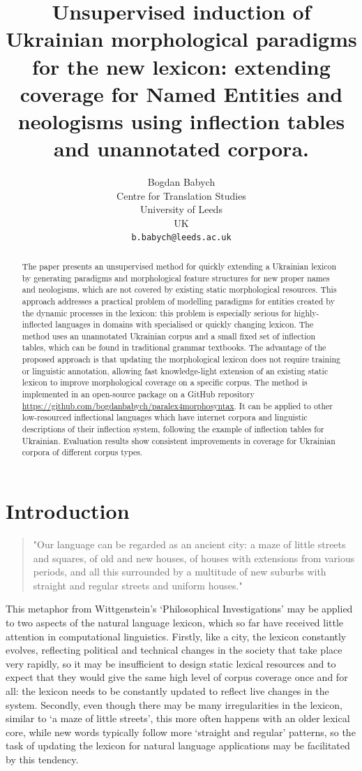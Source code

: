 \documentclass[11pt,a4paper]{article}
\title{Unsupervised induction of Ukrainian morphological paradigms for the new lexicon: extending coverage for Named Entities and neologisms using inflection tables and unannotated corpora.}
\author{Bogdan Babych \\
  Centre for Translation Studies \\
  University of Leeds \\
  UK \\
  \texttt{b.babych@leeds.ac.uk} \\ }
\date{}
\begin{document}
\maketitle
\begin{abstract}
	The paper presents an unsupervised method for quickly extending a Ukrainian lexicon by generating paradigms and morphological feature structures for new proper names and neologisms, which are not covered by existing static morphological resources. This approach addresses a practical problem of modelling paradigms for entities created by the dynamic processes in the lexicon: this problem is especially serious for highly-inflected languages in  domains with specialised or quickly changing lexicon. The method uses an unannotated Ukrainian corpus and a small fixed set of inflection tables, which can be found in traditional grammar textbooks. The advantage of the proposed approach is that updating the morphological lexicon does not require training or linguistic annotation, allowing fast knowledge-light extension of an existing static lexicon to improve morphological coverage on a specific corpus. The method is implemented in an open-source package on a GitHub repository \url{https://github.com/bogdanbabych/paralex4morphosyntax}. It can be applied to other low-resourced inflectional languages which have internet corpora and linguistic descriptions of their inflection system, following the example of inflection tables for Ukrainian. Evaluation results show consistent improvements in coverage for Ukrainian corpora of different corpus types.
	

\end{abstract}


\section{Introduction}


\begin{quote}
	"Our language can be regarded as an ancient city: a maze of little streets and squares, of old and new houses, of houses with extensions from various periods, and all this surrounded by a multitude of new suburbs with straight and regular streets and uniform houses." \cite{Wittgenstein-2009}
\end{quote}
This metaphor from Wittgenstein's `Philosophical Investigations' may be applied to two aspects of the natural language lexicon, which so far have received little attention in computational linguistics. Firstly, like a city, the lexicon constantly evolves, reflecting political and technical changes in the society that take place very rapidly, so it may be insufficient to design static lexical resources and to expect that they would give the same high level of corpus coverage once and for all: the lexicon needs to be constantly updated to reflect live changes in the system. Secondly, even though there may be many irregularities in the lexicon, similar to `a maze of little streets', this more often happens with an older lexical core, while new words typically follow more `straight and regular' patterns, so the task of updating the lexicon for natural language applications may be facilitated by this tendency.
\end{document}
